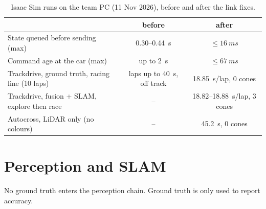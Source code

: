 \documentclass[11pt]{article}
\begin{document}
\begin{table}[t]
\centering\small
\caption{Isaac Sim runs on the team PC (11 Nov 2026), before and after the link fixes.}
\label{tab:isaac}
\begin{tabular}{@{}lcc@{}}
\toprule
& before & after\\
\midrule
State queued before sending (max) & 0.30--\SI{0.44}{s} & $\le\SI{16}{ms}$\\
Command age at the car (max) & up to \SI{2}{s} & $\le\SI{67}{ms}$\\
Trackdrive, ground truth, racing line (10 laps) & laps up to \SI{40}{s}, off track & \SI{18.85}{s}/lap, 0 cones\\
Trackdrive, fusion + SLAM, explore then race & -- & 18.82--\SI{18.88}{s}/lap, 3 cones\\
Autocross, LiDAR only (no colours) & -- & \SI{45.2}{s}, 0 cones\\
\bottomrule
\end{tabular}
\end{table}

\section{Perception and SLAM}\label{sec:perception}
No ground truth enters the perception chain. Ground truth is only used to report accuracy.
\end{document}
